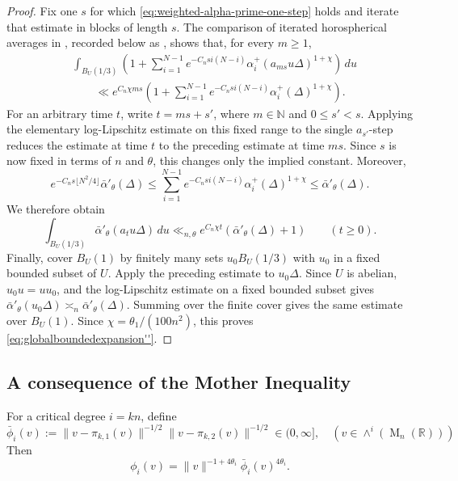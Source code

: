 \documentclass[reqno,11pt]{amsart}
\numberwithin{equation}{section}
\theoremstyle{definition}
\theoremstyle{remark}
\newcommand{\op}{\operatorname}
\newcommand{\br}{\mathbb R}
\newcommand{\M}{\op{M}}
\begin{document}
\begin{proof}
Fix one $s$ for which \eqref{eq:weighted-alpha-prime-one-step} holds and
iterate that estimate in blocks of length $s$. The comparison of iterated
horospherical averages in \cite[Lemma~6.1]{Kim}, recorded below as
, shows that, for every $m\ge1$,
\begin{align*}
&\int_{B_{U}(1/3)}
\left(
1+\sum_{i=1}^{N-1}
e^{-C_nsi(N-i)}
\alpha_i^+(a_{ms}u\Delta)^{1+\chi}
\right)\,du\\
&\qquad\ll
e^{C_n\chi ms}
\left(
1+\sum_{i=1}^{N-1}
e^{-C_nsi(N-i)}
\alpha_i^+(\Delta)^{1+\chi}
\right).
\end{align*}
For an arbitrary time $t$, write $t=ms+s'$, where $m\in\mathbb N$ and
$0\le s'<s$. Applying the elementary log-Lipschitz estimate on this fixed range to the single
$a_{s'}$-step reduces the estimate at time $t$ to the preceding estimate at
time $ms$. Since $s$ is now fixed in terms of $n$ and $\theta$, this
changes only the implied constant. Moreover,
$$
e^{-C_ns\lfloor N^2/4\rfloor}\bar\alpha'_\theta(\Delta)
\le
\sum_{i=1}^{N-1}
e^{-C_nsi(N-i)}\alpha_i^+(\Delta)^{1+\chi}
\le
\bar\alpha'_\theta(\Delta).
$$
We therefore obtain
$$
\int_{B_{U}(1/3)}
\bar\alpha'_\theta(a_tu\Delta)\,du
\ll_{n,\theta}
e^{C_n\chi t}\left(\bar\alpha'_\theta(\Delta)+1\right)
\qquad(t\ge0).
$$
Finally, cover $B_{U}(1)$ by finitely many sets $u_0B_{U}(1/3)$ with $u_0$
in a fixed bounded subset of $U$. Apply the preceding estimate to
$u_0\Delta$. Since $U$ is abelian, $u_0u=uu_0$, and the log-Lipschitz
estimate on a fixed bounded subset gives
$\bar\alpha'_\theta(u_0\Delta)\asymp_n
\bar\alpha'_\theta(\Delta)$. Summing over the finite cover gives the same
estimate over $B_{U}(1)$. Since
$\chi=\theta_1/(100n^2)$, this proves
\eqref{eq:globalboundedexpansion''}.
\end{proof}


\subsection{A consequence of the Mother Inequality}

For a critical degree $i=kn$, define
\begin{equation}\label{eq:bar-phi-definition}
\bar\phi_i(v)
:=
\|v-\pi_{k,1}(v)\|^{-1/2}
\|v-\pi_{k,2}(v)\|^{-1/2}\in (0, \infty],\quad (v\in \wedge^i(\M_n(\br)))
\end{equation}
Then
\begin{equation}\label{eq:phi-decomposition-global}
\phi_i(v)=\|v\|^{-1+4\theta_i}\bar\phi_i(v)^{4\theta_i}.
\end{equation}
\end{document}
